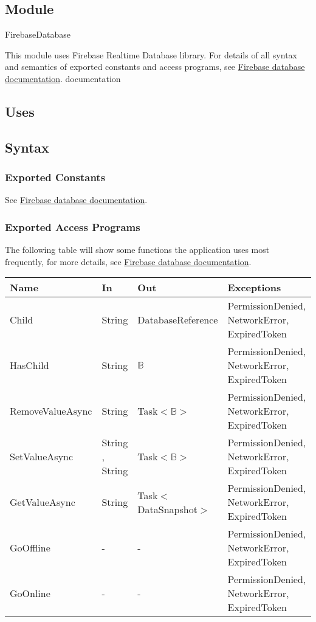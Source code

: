 \documentclass[12pt, titlepage]{article}
\begin{document}
\subsection{Module}

FirebaseDatabase

\noindent This module uses Firebase Realtime Database library. For details of all syntax and semantics of exported constants and access programs, see \href{https://firebase.google.com/docs/reference/unity/namespace/firebase/database}{Firebase database documentation}.
documentation
\subsection{Uses}

\subsection{Syntax}

\subsubsection{Exported Constants}
See \href{https://firebase.google.com/docs/reference/unity/namespace/firebase/database}{Firebase database documentation}.
\subsubsection{Exported Access Programs}
The following table will show some functions the application uses most frequently, for more details, see \href{https://firebase.google.com/docs/reference/unity/namespace/firebase/database}{Firebase database documentation}.
\begin{center}
\begin{tabular}{p{4cm} p{2cm} p{4cm} p{4cm}}
\hline
\textbf{Name} & \textbf{In} & \textbf{Out} & \textbf{Exceptions} \\
\hline
Child & String & DatabaseReference & PermissionDenied, NetworkError, ExpiredToken \\
HasChild & String & $\mathbb{B}$ & PermissionDenied, NetworkError, ExpiredToken \\
RemoveValueAsync & String & Task$<\mathbb{B}>$ & PermissionDenied,  NetworkError,  ExpiredToken \\
SetValueAsync & String , String & Task$<\mathbb{B}>$ & PermissionDenied,  NetworkError,  ExpiredToken \\
GetValueAsync & String & Task$<$DataSnapshot$>$ & PermissionDenied, NetworkError,  ExpiredToken \\
GoOffline & - & - & PermissionDenied, NetworkError,  ExpiredToken \\
GoOnline & - & - & PermissionDenied, NetworkError,  ExpiredToken \\
\hline
\end{tabular}
\end{center}
\end{document}
